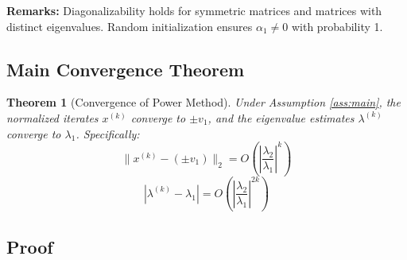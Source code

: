 \documentclass[11pt,twocolumn]{article}
\newtheorem{theorem}{Theorem}
\begin{document}
\textbf{Remarks:} Diagonalizability holds for symmetric matrices and matrices with distinct eigenvalues. Random initialization ensures $\alpha_1 \neq 0$ with probability 1.

\subsection{Main Convergence Theorem}

\begin{theorem}[Convergence of Power Method]
\label{thm:main}
Under Assumption \ref{ass:main}, the normalized iterates $x^{(k)}$ converge to $\pm v_1$, and the eigenvalue estimates $\lambda^{(k)}$ converge to $\lambda_1$. Specifically:
\begin{equation}
\|x^{(k)} - (\pm v_1)\|_2 = O\left(\left|\frac{\lambda_2}{\lambda_1}\right|^k\right)
\end{equation}
\begin{equation}
|\lambda^{(k)} - \lambda_1| = O\left(\left|\frac{\lambda_2}{\lambda_1}\right|^{2k}\right)
\end{equation}
\end{theorem}

\subsection{Proof}
\end{document}
